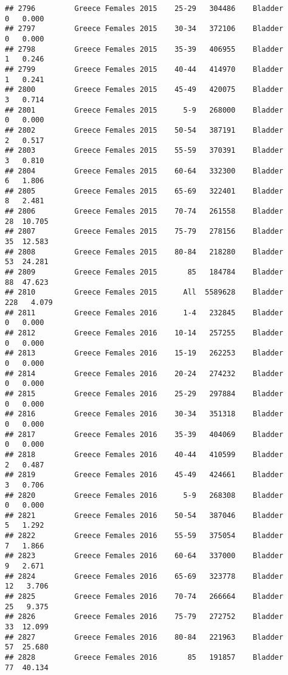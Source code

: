 \documentclass[
]{article}
\begin{document}
\begin{verbatim}
## 2796         Greece Females 2015    25-29   304486    Bladder      0   0.000
## 2797         Greece Females 2015    30-34   372106    Bladder      0   0.000
## 2798         Greece Females 2015    35-39   406955    Bladder      1   0.246
## 2799         Greece Females 2015    40-44   414970    Bladder      1   0.241
## 2800         Greece Females 2015    45-49   420075    Bladder      3   0.714
## 2801         Greece Females 2015      5-9   268000    Bladder      0   0.000
## 2802         Greece Females 2015    50-54   387191    Bladder      2   0.517
## 2803         Greece Females 2015    55-59   370391    Bladder      3   0.810
## 2804         Greece Females 2015    60-64   332300    Bladder      6   1.806
## 2805         Greece Females 2015    65-69   322401    Bladder      8   2.481
## 2806         Greece Females 2015    70-74   261558    Bladder     28  10.705
## 2807         Greece Females 2015    75-79   278156    Bladder     35  12.583
## 2808         Greece Females 2015    80-84   218280    Bladder     53  24.281
## 2809         Greece Females 2015       85   184784    Bladder     88  47.623
## 2810         Greece Females 2015      All  5589628    Bladder    228   4.079
## 2811         Greece Females 2016      1-4   232845    Bladder      0   0.000
## 2812         Greece Females 2016    10-14   257255    Bladder      0   0.000
## 2813         Greece Females 2016    15-19   262253    Bladder      0   0.000
## 2814         Greece Females 2016    20-24   274232    Bladder      0   0.000
## 2815         Greece Females 2016    25-29   297884    Bladder      0   0.000
## 2816         Greece Females 2016    30-34   351318    Bladder      0   0.000
## 2817         Greece Females 2016    35-39   404069    Bladder      0   0.000
## 2818         Greece Females 2016    40-44   410599    Bladder      2   0.487
## 2819         Greece Females 2016    45-49   424661    Bladder      3   0.706
## 2820         Greece Females 2016      5-9   268308    Bladder      0   0.000
## 2821         Greece Females 2016    50-54   387046    Bladder      5   1.292
## 2822         Greece Females 2016    55-59   375054    Bladder      7   1.866
## 2823         Greece Females 2016    60-64   337000    Bladder      9   2.671
## 2824         Greece Females 2016    65-69   323778    Bladder     12   3.706
## 2825         Greece Females 2016    70-74   266664    Bladder     25   9.375
## 2826         Greece Females 2016    75-79   272752    Bladder     33  12.099
## 2827         Greece Females 2016    80-84   221963    Bladder     57  25.680
## 2828         Greece Females 2016       85   191857    Bladder     77  40.134

\end{verbatim}
\end{document}

